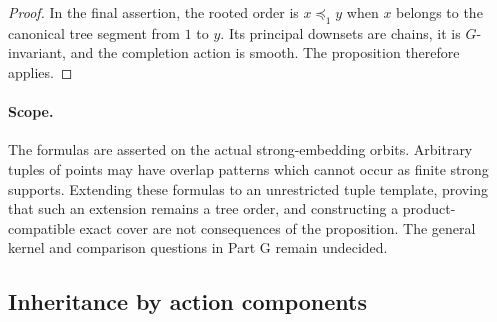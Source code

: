 \begin{proof}
In the final assertion, the rooted order is $x\preceq_1 y$
when $x$ belongs to the canonical tree segment from $1$ to $y$.
Its principal downsets are chains, it is $G$-invariant, and the
completion action is smooth. The proposition therefore applies.
\end{proof}

\paragraph{Scope.}
The formulas are asserted on the actual strong-embedding
orbits. Arbitrary tuples of points may have overlap patterns
which cannot occur as finite strong supports. Extending these
formulas to an unrestricted tuple template, proving that such
an extension remains a tree order, and constructing a
product-compatible exact cover are not consequences of the
proposition. The general kernel and comparison questions in
Part G remain undecided.


\subsection{Inheritance by action components}

